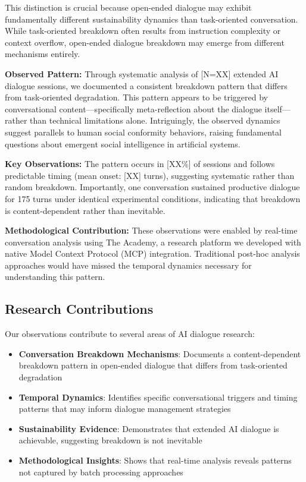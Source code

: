 \documentclass[11pt,letterpaper]{article}
\newcommand{\theacademy}{The Academy}
\newcommand{\totalSessions}{[N=XX]} %
\newcommand{\breakdownPercentage}{[XX\%]} %
\newcommand{\meanBreakdownTurn}{[XX]} %
\newcommand{\negativeCase}{175} %
\begin{document}
This distinction is crucial because open-ended dialogue may exhibit fundamentally different sustainability dynamics than task-oriented conversation. While task-oriented breakdown often results from instruction complexity or context overflow, open-ended dialogue breakdown may emerge from different mechanisms entirely.

\textbf{Observed Pattern:} Through systematic analysis of \totalSessions{} extended AI dialogue sessions, we documented a consistent breakdown pattern that differs from task-oriented degradation. This pattern appears to be triggered by conversational content—specifically meta-reflection about the dialogue itself—rather than technical limitations alone. Intriguingly, the observed dynamics suggest parallels to human social conformity behaviors, raising fundamental questions about emergent social intelligence in artificial systems.

\textbf{Key Observations:} The pattern occurs in \breakdownPercentage{} of sessions and follows predictable timing (mean onset: \meanBreakdownTurn{} turns), suggesting systematic rather than random breakdown. Importantly, one conversation sustained productive dialogue for \negativeCase{} turns under identical experimental conditions, indicating that breakdown is content-dependent rather than inevitable.

\textbf{Methodological Contribution:} These observations were enabled by real-time conversation analysis using \theacademy{}, a research platform we developed with native Model Context Protocol (MCP) integration. Traditional post-hoc analysis approaches would have missed the temporal dynamics necessary for understanding this pattern.

\subsection{Research Contributions}

Our observations contribute to several areas of AI dialogue research:

\begin{itemize}
    \item \textbf{Conversation Breakdown Mechanisms}: Documents a content-dependent breakdown pattern in open-ended dialogue that differs from task-oriented degradation
    \item \textbf{Temporal Dynamics}: Identifies specific conversational triggers and timing patterns that may inform dialogue management strategies
    \item \textbf{Sustainability Evidence}: Demonstrates that extended AI dialogue is achievable, suggesting breakdown is not inevitable
    \item \textbf{Methodological Insights}: Shows that real-time analysis reveals patterns not captured by batch processing approaches
\end{itemize}
\end{document}
